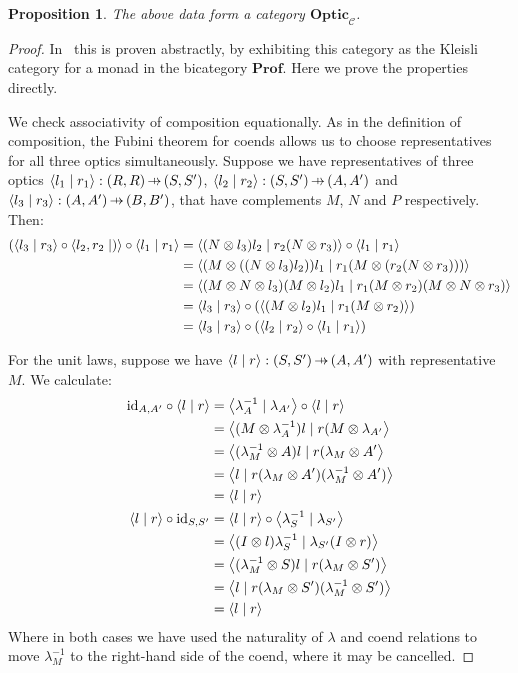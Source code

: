 \documentclass[11pt,a4paper]{article}
\theoremstyle{plain}
\newtheorem{proposition}[theorem]{Proposition}
\theoremstyle{definition}
\newcommand{\C}{\mathscr{C}}
\newcommand{\Prof}{\mathbf{Prof}}
\newcommand{\Optic}{\mathbf{Optic}}
\newcommand{\id}{\mathrm{id}}
\newcommand{\rep}[2]{{\ensuremath \left\langle #1 \mid #2 \right\rangle}}
\newcommand{\hto}{\ensuremath{\,\mathaccent\shortmid\rightarrow\,}}
\begin{document}
\begin{proposition}\label{prop-optic-is-cat}
  The above data form a category $\Optic_\C$.
\end{proposition}
\begin{proof}
  In~\cite[Section 6]{Doubles} this is proven abstractly, by exhibiting this category as the Kleisli category for a monad in the bicategory $\Prof$. Here we prove the properties directly.

  We check associativity of composition equationally. As in the definition of composition, the Fubini theorem for coends allows us to choose representatives for all three optics simultaneously. Suppose we have representatives of three optics $\rep{l_1}{r_1} : (R, R) \hto (S, S')$, $\rep{l_2}{r_2} : (S, S') \hto (A, A')$ and $\rep{l_3}{r_3} : (A, A') \hto (B, B')$, that have complements $M$, $N$ and $P$ respectively. Then:
  \begin{align*}
    (\rep{l_3}{r_3} \circ \rep{l_2, r_2}) \circ \rep{l_1}{r_1}
    &= \rep{(N \otimes l_3)l_2}{r_2(N \otimes r_3)} \circ \rep{l_1}{r_1} \\
    &= \rep{(M \otimes ((N \otimes l_3)l_2))l_1}{r_1(M \otimes (r_2(N \otimes r_3)))} \\
    &= \rep{(M \otimes N \otimes l_3)(M \otimes l_2)l_1}{r_1(M \otimes r_2)(M \otimes N \otimes r_3)} \\
    &= \rep{l_3}{r_3} \circ (\rep{(M \otimes l_2)l_1}{r_1(M \otimes r_2)}) \\
    &= \rep{l_3}{r_3} \circ (\rep{l_2}{r_2} \circ \rep{l_1}{r_1})
  \end{align*}

  For the unit laws, suppose we have $\rep{l}{r} : (S, S') \hto (A, A')$ with representative $M$. We calculate:
  \begin{align*}
    \id_{A, A'} \circ \rep{l}{r}
    &= \rep{\lambda^{-1}_A}{\lambda_{A'}} \circ \rep{l}{r} \\
    &= \rep{(M \otimes \lambda^{-1}_A) l}{r (M\otimes  \lambda_{A'}} \\
    &= \rep{(\lambda^{-1}_M \otimes  A) l}{r (\lambda_M \otimes A'} \\
    &= \rep{l}{r (\lambda_M \otimes A') (\lambda^{-1}_M \otimes A')} \\
    &= \rep{l}{r} \\
    \rep{l}{r} \circ \id_{S, S'}
    &= \rep{l}{r} \circ \rep{\lambda^{-1}_S}{\lambda_{S'}}  \\
    &= \rep{(I \otimes l)\lambda^{-1}_S}{\lambda_{S'} (I \otimes r)} \\
    &= \rep{(\lambda^{-1}_M \otimes S)l}{r (\lambda_{M} \otimes S')} \\
    &= \rep{l}{r (\lambda_{M} \otimes S')(\lambda^{-1}_M \otimes S')} \\
    &= \rep{l}{r}
  \end{align*}
  Where in both cases we have used the naturality of $\lambda$ and coend relations to move $\lambda^{-1}_M$ to the right-hand side of the coend, where it may be cancelled.
\end{proof}
\end{document}
